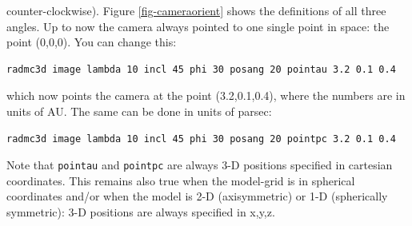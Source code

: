 \documentclass{report}
\newenvironment{asciibox}%
  {\begin{list}{}{%
    \setlength{\topsep}{0.5em}%
    \setlength{\parskip}{0em}%
    \setlength{\parsep}{0em}%
    \setlength{\itemsep}{0em}%
    \setlength{\rightmargin}{0em}%
    \setlength{\leftmargin}{3.0em}%
    \setlength{\labelsep}{1em}%
    \setlength{\labelwidth}{2em}%
  }\normalfont\footnotesize\item}
  {\end{list}}
\begin{document}
counter-clockwise). Figure \ref{fig-cameraorient} shows the definitions of
all three angles. Up to now the camera always pointed to one single point
in space: the point (0,0,0). You can change this:
\begin{asciibox}\begin{verbatim}
radmc3d image lambda 10 incl 45 phi 30 posang 20 pointau 3.2 0.1 0.4
\end{verbatim}\end{asciibox}
which now points the camera at the point (3.2,0.1,0.4), where the numbers
are in units of AU. The same can be done in units of parsec:
\begin{asciibox}\begin{verbatim}
radmc3d image lambda 10 incl 45 phi 30 posang 20 pointpc 3.2 0.1 0.4
\end{verbatim}\end{asciibox}
Note that {\small\tt pointau} and {\small\tt pointpc} are always 3-D
positions specified in cartesian coordinates. This remains also true when
the model-grid is in spherical coordinates and/or when the model is 2-D
(axisymmetric) or 1-D (spherically symmetric): 3-D positions are always
specified in x,y,z. 
\end{document}
